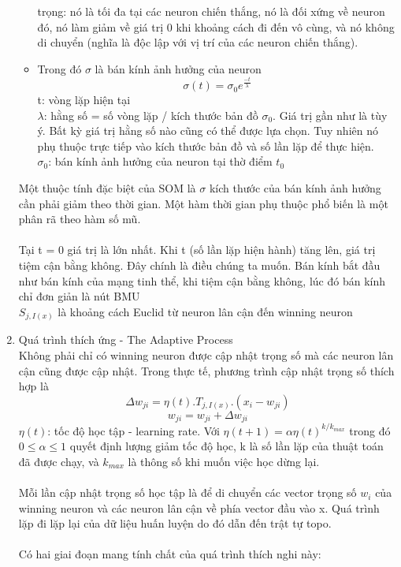 \begin{enumerate}
\begin{itemize}
	    trọng: nó là tối đa tại các neuron chiến thắng, nó là đối xứng về neuron đó, nó
	    làm giảm về giá trị 0 khi khoảng cách đi đến vô cùng, và nó không di chuyển 
	    (nghĩa là độc lập với vị trí của các neuron chiến thắng).
	    \item Trong đó $\sigma$ là bán kính ảnh hưởng của neuron
	    \[ \sigma(t) = \sigma_0 e^{\frac{-t}{\lambda}} \]
	    \tab t: vòng lặp hiện tại\\
	    \tab $\lambda$: hằng số = số vòng lặp / kích thước bản đồ $\sigma_0$. Giá
	    trị gần như là tùy ý. Bất kỳ giá trị hằng số nào cũng có thể được lựa chọn.
	    Tuy nhiên nó phụ thuộc trực tiếp vào kích thước bản đồ và số lần lặp để
	    thực hiện.\\
	    \tab $\sigma_0$: bán kính ảnh hưởng của neuron tại thờ điểm $t_0$ 
	  \end{itemize}
	  Một thuộc tính đặc biệt của SOM là $\sigma$ kích thước của bán kính ảnh hưởng
	  cần phải giảm theo thời gian. Một hàm thời gian phụ thuộc phổ biến là một
	  phân rã theo hàm số mũ.\\\\
	  Tại t = 0 giá trị là lớn nhất. Khi t (số lần lặp hiện hành) tăng lên,
	  giá trị tiệm cận bằng không. Đây chính là điều chúng ta muốn. Bán kính bắt
	  đầu như bán kính của mạng tinh thể, khi tiệm cận bằng không, lúc đó bán kính chỉ đơn giản là nút BMU\\
	  $S_{j,I(x)}$ là khoảng cách Euclid từ neuron lân cận đến winning neuron
	  \item Quá trình thích ứng - The Adaptive Process\\
	  Không phải chỉ có winning neuron được cập nhật trọng số mà các neuron lân cận
	  cũng được cập nhật. Trong thực tế, phương trình cập nhật trọng số thích hợp
	  là 
	  \[ \Delta w_{ji} = \eta(t).T_{j,I(x)} . (x_i - w_{ji})  \]
	  \[ w_{ji} = w_{ji} + \Delta w_{ji} \]
	  $\eta(t)$: tốc độ học tập - learning rate. Với $\eta(t+1) = \alpha
	  \eta(t)^{k/k_{max}}$ trong đó $0 \leq \alpha \leq 1$ quyết định lượng giảm
	  tốc độ học, k là số lần lặp của thuật toán đã được chạy, và $k_{max}$ là
	  thông số khi muốn việc học dừng lại.\\\\ 
	  Mỗi lần cập nhật trọng số học tập là để di chuyển các vector trọng số $w_i$
	  của winning neuron và các neuron lân cận về phía vector đầu vào x. Quá trình lặp
	  đi lặp lại của dữ liệu huấn luyện do đó dẫn đến trật tự topo.\\\\ 
	  Có hai giai đoạn mang tính chất của quá trình thích nghi này:

\end{enumerate}
